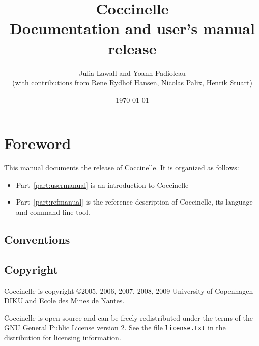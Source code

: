 \documentclass{report}
\begin{document}
\date{}

\title{
{\LARGE \bf Coccinelle}\\
{Documentation and user's manual}\\
{release \cocciversion}\\
}

\author{
Julia Lawall and Yoann Padioleau \\
{(with contributions from 
Rene Rydhof Hansen, 
Nicolas Palix, 
Henrik Stuart)
}
}  

\date{\today}

\maketitle
\tableofcontents


\chapter*{Foreword} 

This manual documents the release \cocciversion of Coccinelle.
It is organized as follows:
\begin{itemize}
  \item Part~\ref{part:usermanual} is an introduction to Coccinelle
  \item Part~\ref{part:refmanual} is the reference description
    of Coccinelle, its language and command line tool.
\end{itemize}

\section*{Conventions}

\section*{Copyright}

Coccinelle is copyright \copyright 2005, 2006, 2007, 2008, 2009 
University of Copenhagen DIKU and Ecole des Mines de Nantes.

Coccinelle is open source and can be freely redistributed under the
terms of the GNU General Public License version 2. See the file
\verb+license.txt+ in the distribution for licensing information.
\end{document}
